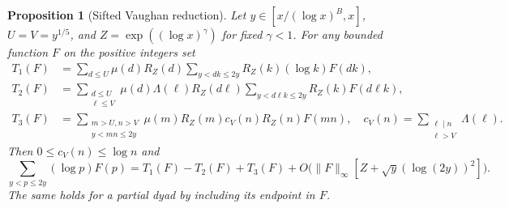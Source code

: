 \documentclass[11pt]{article}
\newtheorem{proposition}[theorem]{Proposition}
\theoremstyle{definition}
\theoremstyle{remark}
\numberwithin{equation}{section}
\begin{document}
\begin{proposition}[Sifted Vaughan reduction]\label{prop:vaughan}
Let $y\in[x/(\log x)^B,x]$, $U=V=y^{1/5}$, and
$Z=\exp((\log x)^\gamma)$ for fixed $\gamma<1$.
For any bounded function $F$ on the positive integers set
\begin{align}
 T_1(F)&=\sum_{d\le U}\mu(d)R_Z(d)
       \sum_{y<dk\le2y}R_Z(k)(\log k)F(dk),\label{eq:T1}\\
 T_2(F)&=\sum_{\substack{d\le U\\\ell\le V}}
       \mu(d)\Lambda(\ell)R_Z(d\ell)
       \sum_{y<d\ell k\le2y}R_Z(k)F(d\ell k),\label{eq:T2}\\
 T_3(F)&=\sum_{\substack{m>U,n>V\\y<mn\le2y}}
       \mu(m)R_Z(m)c_V(n)R_Z(n)F(mn),\quad
       c_V(n)=\sum_{\substack{\ell\mid n\\\ell>V}}\Lambda(\ell).
       \label{eq:T3}
\end{align}
Then $0\le c_V(n)\le\log n$ and
\begin{equation}\label{eq:sifted-vaughan}
 \sum_{y<p\le2y}(\log p)F(p)
 =T_1(F)-T_2(F)+T_3(F)
  +O\bigl(\|F\|_\infty[Z+\sqrt y(\log(2y))^2]\bigr).
\end{equation}
The same holds for a partial dyad by including its endpoint in $F$.
\end{proposition}
\end{document}
